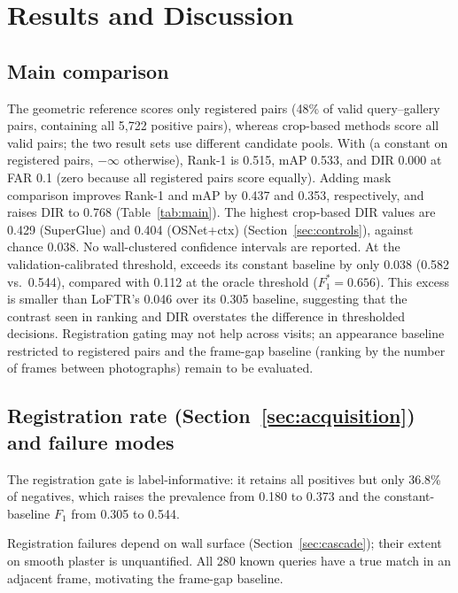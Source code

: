 \section{Results and Discussion}
\label{sec:results}

\subsection{Main comparison}

The geometric reference scores only registered pairs (48\% of valid query--gallery pairs, containing all 5,722 positive pairs), whereas crop-based methods score all valid pairs; the two result sets use different candidate pools.
With \regonly{} (a constant on registered pairs, $-\infty$ otherwise), Rank-1 is 0.515, mAP 0.533, and DIR 0.000 at FAR 0.1 (zero because all registered pairs score equally). Adding mask comparison improves Rank-1 and mAP by 0.437 and 0.353, respectively, and raises DIR to 0.768 (Table~\ref{tab:main}). The highest crop-based DIR values are 0.429 (SuperGlue) and 0.404 (OSNet+ctx) (Section~\ref{sec:controls}), against chance 0.038.
No wall-clustered confidence intervals are reported.
At the validation-calibrated threshold, \ours{} exceeds its constant baseline by only 0.038 (0.582 vs.\ 0.544), compared with 0.112 at the oracle threshold ($F_1^{*} = 0.656$). This excess is smaller than LoFTR's 0.046 over its 0.305 baseline, suggesting that the contrast seen in ranking and DIR overstates the difference in thresholded decisions.
Registration gating may not help across visits; an appearance baseline restricted to registered pairs and the frame-gap baseline (ranking by the number of frames between photographs) remain to be evaluated.

\subsection{Registration rate (Section~\ref{sec:acquisition}) and failure modes}
\label{sec:coverage}
\label{sec:chamferablation}

The registration gate is label-informative: it retains all positives but only 36.8\% of negatives, which raises the prevalence from 0.180 to 0.373 and the constant-baseline $F_1$ from 0.305 to 0.544.

Registration failures depend on wall surface (Section~\ref{sec:cascade}); their extent on smooth plaster is unquantified. All 280 known queries have a true match in an adjacent frame, motivating the frame-gap baseline.

